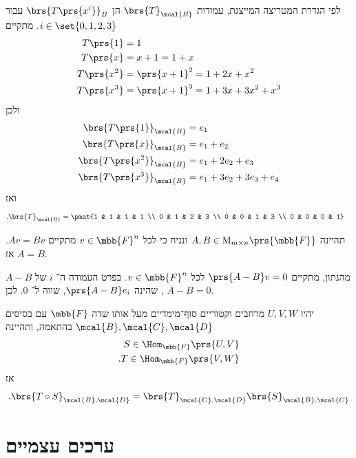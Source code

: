 \documentclass[a4paper,10pt,twoside,openany]{book}
\renewcommand{\Mat}{\mathrm{M}}
\begin{document}
\begin{solution}
לפי הגדרת המטריצה המייצגת,
עמודות
$\brs{T}_\mcal{B}$
הן
$\brs{T\prs{x^i}}_B$
עבור
$i \in \set{0,1,2,3}$.
מתקיים
\begin{align*}
T\prs{1} &= 1 \\
T\prs{x} &= x+1 = 1 + x \\
T\prs{x^2} &= \prs{x+1}^2 = 1 + 2x + x^2 \\
T\prs{x^3} &= \prs{x+1}^3 = 1 + 3x + 3x^2 + x^3
\end{align*}
ולכן
\begin{align*}
\brs{T\prs{1}}_\mcal{B} &= e_1 \\
\brs{T\prs{x}}_\mcal{B} &= e_1 + e_2 \\
\brs{T\prs{x^2}}_\mcal{B} &= e_1 + 2 e_2 + e_3 \\
\brs{T\prs{x^3}}_\mcal{B} &= e_1 + 3 e_2 + 3 e_3 + e_4
\end{align*}
ואז
\begin{align*}
\text{.} \brs{T}_\mcal{B} &= \pmat{1 & 1 & 1 & 1 \\ 0 & 1 & 2 & 3 \\ 0 & 0 & 1 & 3 \\ 0 & 0 & 0 & 1}
\end{align*}
\end{solution}

\begin{exercisechap}
תהיינה
$A,B \in \Mat_{m \times n}\prs{\mbb{F}}$
ונניח כי לכל
$v \in \mbb{F}^n$
מתקיים
$Av = Bv$.
אז
$A = B$.
\end{exercisechap}

\begin{solution}
מהנתון, מתקיים
$\prs{A - B}v = 0$
לכל
$v \in \mbb{F}^n$.
בפרט העמודה ה־%
$i$
של
$A-B$,
שהינה
$\prs{A - B}e_i$,
שווה ל־%
$0$.
לכן
$A - B = 0$.
\end{solution}

\begin{proposition}
יהיו
$U,V,W$
מרחבים וקטוריים סוף־מימדיים מעל אותו שדה
$\mbb{F}$
עם בסיסים
$\mcal{B},\mcal{C},\mcal{D}$
בהתאמה,
ותהיינה
\begin{align*}
S \in \Hom_{\mbb{F}}\prs{U,V} \\
\text{.} T \in \Hom_{\mbb{F}}\prs{V,W}
\end{align*}
אז
\[\text{.} \brs{T \circ S}_{\mcal{B},\mcal{D}} = \brs{T}_{\mcal{C},\mcal{D}} \brs{S}_{\mcal{B},\mcal{C}}\]
\end{proposition}

\chapter{ערכים עצמיים}
\end{document}
